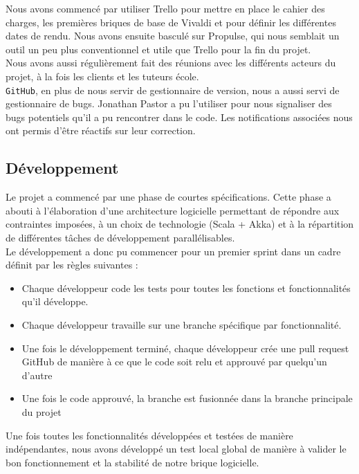 \documentclass[11pt,a4paper]{article}
\begin{document}
Nous avons commencé par utiliser Trello pour mettre en place le cahier des charges, les premières briques de base de Vivaldi et pour définir les différentes dates de rendu. Nous avons ensuite basculé sur Propulse, qui nous semblait un outil un peu plus conventionnel et utile que Trello pour la fin du projet.\\

Nous avons aussi régulièrement fait des réunions avec les différents acteurs du projet, à la fois les clients et les tuteurs école.\\

\texttt{GitHub}, en plus de nous servir de gestionnaire de version, nous a aussi servi de gestionnaire de bugs. Jonathan Pastor a pu l'utiliser pour nous signaliser des bugs potentiels qu'il a pu rencontrer dans le code. Les notifications associées nous ont permis d'être réactifs sur leur correction.

\subsection{Développement}
\label{subsec:dev}
Le projet a commencé par une phase de courtes spécifications. Cette phase a abouti à l'élaboration d'une architecture logicielle permettant de répondre aux contraintes imposées, à un choix de technologie (Scala + Akka) et à la répartition de différentes tâches de développement parallélisables. \\

Le développement a donc pu commencer pour un premier sprint dans un cadre définit par les règles suivantes :

\begin{itemize}
\item Chaque développeur code les tests pour toutes les fonctions et fonctionnalités qu'il développe.
\item Chaque développeur travaille sur une branche spécifique par fonctionnalité.
\item Une fois le développement terminé, chaque développeur crée une pull request GitHub de manière à ce que le code soit relu et approuvé par quelqu'un d'autre
\item Une fois le code approuvé, la branche est fusionnée dans la branche principale du projet \\
\end{itemize}

Une fois toutes les fonctionnalités développées et testées de manière indépendantes, nous avons développé un test local global de manière à valider le bon fonctionnement et la stabilité de notre brique logicielle.\\
\end{document}
